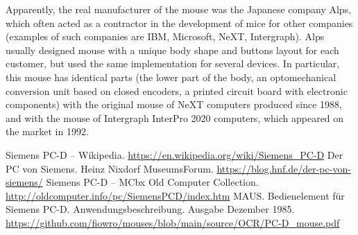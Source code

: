 \documentclass[11pt, a4paper]{article}
\begin{document}
Apparently, the real manufacturer of the mouse was the Japanese company Alps, which often acted as a contractor in the development of mice for other companies (examples of such companies are IBM, Microsoft, NeXT, Intergraph). Alps usually designed mouse with a unique body shape and buttons layout for each customer, but used the same implementation for several devices. In particular, this mouse has identical parts (the lower part of the body, an optomechanical conversion unit based on closed encoders, a printed circuit board with electronic components) with the original mouse of NeXT computers produced since 1988, and with the mouse of Intergraph InterPro 2020 computers, which appeared on the market in 1992.

\begin{thebibliography}{9}
 Siemens PC-D -- Wikipedia. \url{https://en.wikipedia.org/wiki/Siemens_PC-D}
 Der PC von Siemens. Heinz Nixdorf MuseumsForum. \url{https://blog.hnf.de/der-pc-von-siemens/}
 Siemens PC-D -- MCbx Old Computer Collection. \url{http://oldcomputer.info/pc/SiemensPCD/index.htm}
 MAUS. Bedienelement für Siemens PC-D. Anwendungsbeschreibung. Ausgabe Dezember 1985. \url{https://github.com/fiowro/mouses/blob/main/source/OCR/PC-D_mouse.pdf}
\end{thebibliography}
\end{document}

